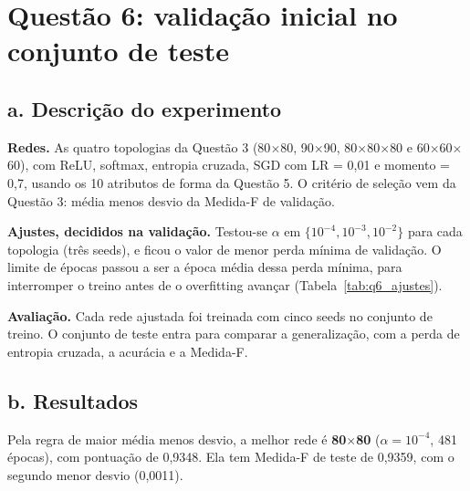 \section{Questão 6: validação inicial no conjunto de teste}

\subsection*{a. Descrição do experimento}

\textbf{Redes.} As quatro topologias da Questão 3 (80$\times$80, 90$\times$90, 80$\times$80$\times$80 e 60$\times$60$\times$60), com ReLU, softmax, entropia cruzada, SGD com LR = 0,01 e momento = 0,7, usando os 10 atributos de forma da Questão 5. O critério de seleção vem da Questão 3:
média menos desvio da Medida-F de validação.

\textbf{Ajustes, decididos na validação.} Testou-se $\alpha$ em $\{10^{-4}, 10^{-3}, 10^{-2}\}$ para cada topologia (três seeds), e ficou o valor de menor perda mínima de validação. O limite de épocas passou a ser a época média dessa perda mínima, para interromper o treino antes de o overfitting
avançar (Tabela~\ref{tab:q6_ajustes}).

\textbf{Avaliação.} Cada rede ajustada foi treinada com cinco seeds no conjunto de treino. O conjunto de teste entra para comparar a generalização, com a perda de entropia cruzada, a acurácia e a Medida-F.

\subsection*{b. Resultados}


Pela regra de maior média menos desvio, a melhor rede é \textbf{80$\times$80} ($\alpha = 10^{-4}$, 481 épocas), com pontuação de 0,9348. Ela tem Medida-F de teste de 0,9359, com o segundo menor desvio (0,0011).

